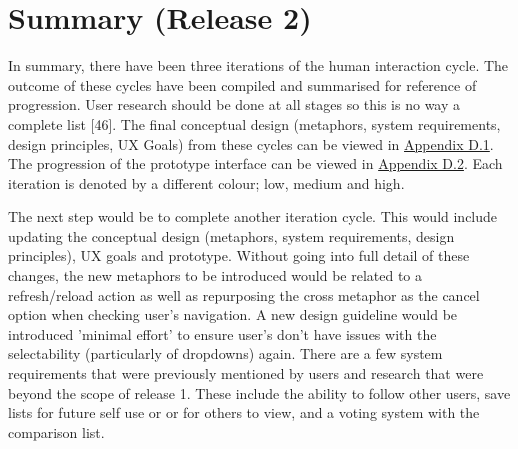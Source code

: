 \documentclass[a4 paper, 12pt]{article}
\begin{document}
\pagebreak


\pagebreak

\pagebreak


\pagebreak
\section{Summary (Release 2)}
In summary, there have been three iterations of the human interaction cycle. The outcome of these cycles have been compiled and summarised for reference of progression. User research should be done at all stages so this is no way a complete list [46]. The final conceptual design (metaphors, system requirements, design principles, UX Goals) from these cycles can be viewed in \hyperref[sec:D.1]{Appendix D.1}. The progression of the prototype interface can be viewed in \hyperref[sec:D.2]{Appendix D.2}. Each iteration is denoted by a different colour; \textcolor{mygreen}{low}, \textcolor{myblue}{medium} and \textcolor{myorange}{high}. 

The next step would be to complete another iteration cycle. This would include updating the conceptual design (metaphors, system requirements, design principles), UX goals and prototype. Without going into full detail of these changes, the new metaphors to be introduced would be related to a refresh/reload action as well as repurposing the cross metaphor as the cancel option when checking user's navigation. A new design guideline would be introduced 'minimal effort' to ensure user's don't have issues with the selectability (particularly of dropdowns) again. There are a few system requirements that were previously mentioned by users and research that were beyond the scope of release 1. These include the ability to follow other users, save lists for future self use or or for others to view, and a voting system with the comparison list.
\end{document}
